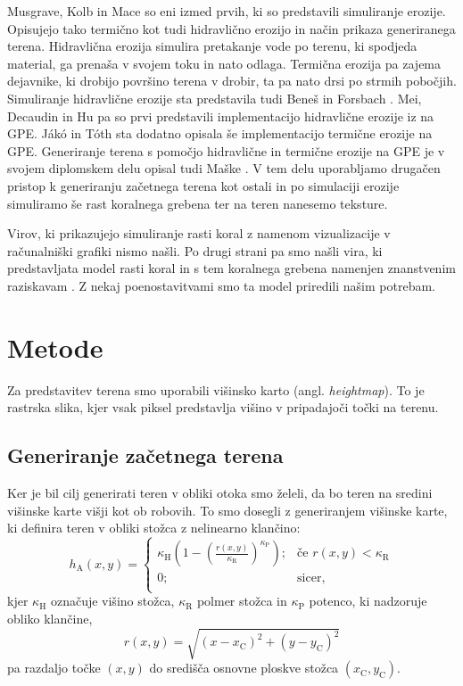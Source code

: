 \documentclass[9pt]{pnas-new}
\newcommand{\const}[1]{{\ensuremath{\kappa_\mathrm{#1}}}}
\begin{document}
Musgrave, Kolb in Mace \cite{synthesis_first_89} so eni izmed prvih, ki so predstavili simuliranje erozije. Opisujejo tako termično kot tudi hidravlično erozijo in način prikaza generiranega terena. Hidravlična erozija simulira pretakanje vode po terenu, ki spodjeda material, ga prenaša v svojem toku in nato odlaga. Termična erozija pa zajema dejavnike, ki drobijo površino terena v drobir, ta pa nato drsi po strmih pobočjih. Simuliranje hidravlične erozije sta predstavila tudi Beneš in Forsbach \cite{benevs_first_02}. Mei, Decaudin in Hu \cite{benevs_fast_gpu_07} pa so prvi predstavili implementacijo hidravlične erozije iz \cite{benevs_first_02} na GPE. Jákó in Tóth \cite{jako_fast_gpu_11} sta dodatno opisala še implementacijo termične erozije na GPE. Generiranje terena s pomočjo hidravlične in termične erozije na GPE je v svojem diplomskem delu opisal tudi Maške \cite{maske_2013}. V tem delu uporabljamo drugačen pristop k generiranju začetnega terena kot ostali in po simulaciji erozije simuliramo še rast koralnega grebena ter na teren nanesemo teksture.

Virov, ki prikazujejo simuliranje rasti koral z namenom vizualizacije v računalniški grafiki nismo našli. Po drugi strani pa smo našli vira, ki predstavljata model rasti koral in s tem koralnega grebena namenjen znanstvenim raziskavam \cite{nakamura_reef_model_07,nakamura_reef_simulation_11}. Z nekaj poenostavitvami smo ta model priredili našim potrebam.

\section*{Metode}
Za predstavitev terena smo uporabili višinsko karto (angl. \emph{heightmap}). To je rastrska slika, kjer vsak piksel predstavlja višino v pripadajoči točki na terenu. 

\subsection*{Generiranje začetnega terena}
Ker je bil cilj generirati teren v obliki otoka smo želeli, da bo teren na sredini višinske karte višji kot ob robovih. To smo dosegli z generiranjem višinske karte, ki definira teren v obliki stožca z nelinearno klančino:
\begin{equation} \label{eq:stozec}
h_\mathrm{A}(x,y) =   
\begin{cases}
\const{H} \left(1-\left(\frac{r(x,y)}{\const{R}}\right)^\const{P}\right); &\text{če } r(x,y) < \const{R}\\
0; &\text{sicer,} \\
\end{cases}
\end{equation}
kjer $\const{H}$ označuje višino stožca, $\const{R}$ polmer stožca in $\const{P}$ potenco, ki nadzoruje obliko klančine,
\begin{equation} \label{eq:dist_to_center}
r(x,y) = \sqrt{(x - x_\mathrm{C})^2 + (y - y_\mathrm{C})^2}
\end{equation}
pa razdaljo točke $(x,y)$ do središča osnovne ploskve stožca $(x_\mathrm{C},y_\mathrm{C})$.
\end{document}
